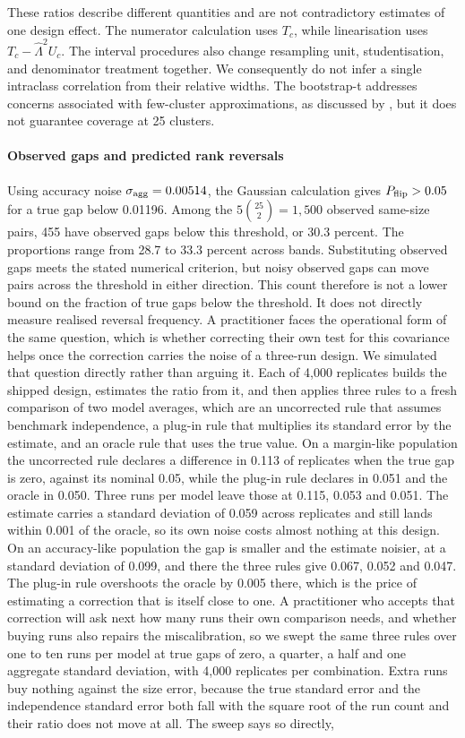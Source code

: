 These ratios describe different quantities and are not contradictory estimates of one design effect. The numerator calculation uses $T_c$, while linearisation uses $T_c-\widehat\Lambda^2U_c$. The interval procedures also change resampling unit, studentisation, and denominator treatment together. We consequently do not infer a single intraclass correlation from their relative widths. The bootstrap-t addresses concerns associated with few-cluster approximations, as discussed by \citet{bell2002}, but it does not guarantee coverage at 25 clusters.

\paragraph{Observed gaps and predicted rank reversals}
Using accuracy noise $\sigma_{\rm agg}=0.00514$, the Gaussian calculation gives $P_{\rm flip}>0.05$ for a true gap below 0.01196. Among the $5\binom{25}{2}=1{,}500$ observed same-size pairs, 455 have observed gaps below this threshold, or 30.3 percent. The proportions range from 28.7 to 33.3 percent across bands. Substituting observed gaps meets the stated numerical criterion, but noisy observed gaps can move pairs across the threshold in either direction. This count therefore is not a lower bound on the fraction of true gaps below the threshold. It does not directly measure realised reversal frequency. A practitioner faces the operational form of the same question, which is whether correcting their own test for this covariance helps once the correction carries the noise of a three-run design. We simulated that question directly rather than arguing it. Each of 4,000 replicates builds the shipped design, estimates the ratio from it, and then applies three rules to a fresh comparison of two model averages, which are an uncorrected rule that assumes benchmark independence, a plug-in rule that multiplies its standard error by the estimate, and an oracle rule that uses the true value. On a margin-like population the uncorrected rule declares a difference in 0.113 of replicates when the true gap is zero, against its nominal 0.05, while the plug-in rule declares in 0.051 and the oracle in 0.050. Three runs per model leave those at 0.115, 0.053 and 0.051. The estimate carries a standard deviation of 0.059 across replicates and still lands within 0.001 of the oracle, so its own noise costs almost nothing at this design. On an accuracy-like population the gap is smaller and the estimate noisier, at a standard deviation of 0.099, and there the three rules give 0.067, 0.052 and 0.047. The plug-in rule overshoots the oracle by 0.005 there, which is the price of estimating a correction that is itself close to one. A practitioner who accepts that correction will ask next how many runs their own comparison needs, and whether buying runs also repairs the miscalibration, so we swept the same three rules over one to ten runs per model at true gaps of zero, a quarter, a half and one aggregate standard deviation, with 4,000 replicates per combination. Extra runs buy nothing against the size error, because the true standard error and the independence standard error both fall with the square root of the run count and their ratio does not move at all. The sweep says so directly, 